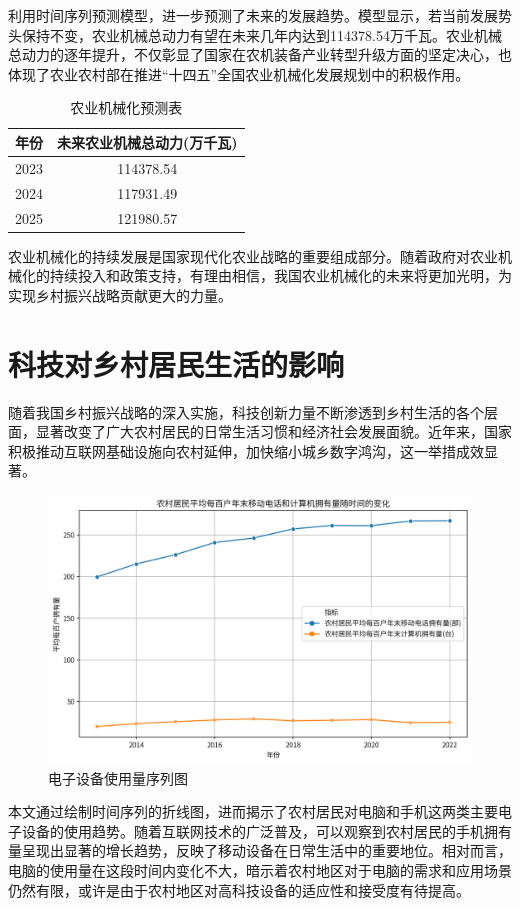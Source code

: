 利用时间序列预测模型，进一步预测了未来的发展趋势。模型显示，若当前发展势头保持不变，农业机械总动力有望在未来几年内达到114378.54万千瓦。农业机械总动力的逐年提升，不仅彰显了国家在农机装备产业转型升级方面的坚定决心，也体现了农业农村部在推进“十四五”全国农业机械化发展规划中的积极作用\cite{china-digital-rural-development-2022}。
\begin{table}[H]
\caption{农业机械化预测表}
\centering
\begin{tabular}{cc}
\hline
\hline
\textbf{年份} &\textbf{未来农业机械总动力(万千瓦)}\\
\hline
2023 & 114378.54\\
2024 & 117931.49\\
2025 & 121980.57\\
\hline
\end{tabular}
\end{table}
农业机械化的持续发展是国家现代化农业战略的重要组成部分。随着政府对农业机械化的持续投入和政策支持，有理由相信，我国农业机械化的未来将更加光明，为实现乡村振兴战略贡献更大的力量。

\section{科技对乡村居民生活的影响}

随着我国乡村振兴战略的深入实施，科技创新力量不断渗透到乡村生活的各个层面，显著改变了广大农村居民的日常生活习惯和经济社会发展面貌。近年来，国家积极推动互联网基础设施向农村延伸，加快缩小城乡数字鸿沟，这一举措成效显著。

\begin{figure}[H]
    \centering
    \includegraphics[width=0.65\linewidth]{figures/42.png}
    \caption{电子设备使用量序列图}
    \label{fig:enter-label}
\end{figure}

本文通过绘制时间序列的折线图，进而揭示了农村居民对电脑和手机这两类主要电子设备的使用趋势。随着互联网技术的广泛普及，可以观察到农村居民的手机拥有量呈现出显著的增长趋势，反映了移动设备在日常生活中的重要地位。相对而言，电脑的使用量在这段时间内变化不大，暗示着农村地区对于电脑的需求和应用场景仍然有限，或许是由于农村地区对高科技设备的适应性和接受度有待提高。

